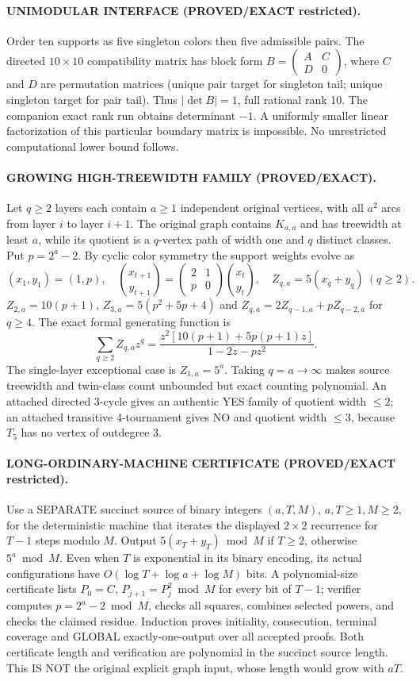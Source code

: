 \documentclass[11pt]{article}
\begin{document}
\paragraph{UNIMODULAR INTERFACE (PROVED/EXACT restricted).}
Order ten supports as five singleton colors then five admissible pairs. The directed $10\times10$ compatibility matrix has block form $B=\left(\begin{smallmatrix}A&C\\D&0\end{smallmatrix}\right)$, where $C$ and $D$ are permutation matrices (unique pair target for singleton tail; unique singleton target for pair tail). Thus $|\det B|=1$, full rational rank 10. The companion exact rank run obtains determinant $-1$. A uniformly smaller linear factorization of this particular boundary matrix is impossible. No unrestricted computational lower bound follows.
\paragraph{GROWING HIGH-TREEWIDTH FAMILY (PROVED/EXACT).}
Let $q\ge2$ layers each contain $a\ge1$ independent original vertices, with all $a^2$ arcs from layer $i$ to layer $i+1$. The original graph contains $K_{a,a}$ and has treewidth at least $a$, while its quotient is a $q$-vertex path of width one and $q$ distinct classes. Put $p=2^a-2$. By cyclic color symmetry the support weights evolve as
\[
(x_1,y_1)=(1,p),\quad
\binom{x_{t+1}}{y_{t+1}}=
\begin{pmatrix}2&1\\p&0\end{pmatrix}
\binom{x_t}{y_t},
\quad Z_{q,a}=5(x_q+y_q)\ (q\ge2).
\]
$Z_{2,a}=10(p+1)$, $Z_{3,a}=5(p^2+5p+4)$ and $Z_{q,a}=2Z_{q-1,a}+pZ_{q-2,a}$ for $q\ge4$. The exact formal generating function is
\[
\sum_{q\ge2}Z_{q,a}z^q =
\frac{z^2[10(p+1)+5p(p+1)z]}{1-2z-pz^2}.
\]
The single-layer exceptional case is $Z_{1,a}=5^a$. Taking $q=a\to\infty$ makes source treewidth and twin-class count unbounded but exact counting polynomial. An attached directed 3-cycle gives an authentic YES family of quotient width $\le2$; an attached transitive 4-tournament gives NO and quotient width $\le3$, because $T_5$ has no vertex of outdegree 3.
\paragraph{LONG-ORDINARY-MACHINE CERTIFICATE (PROVED/EXACT restricted).}
Use a SEPARATE succinct source of binary integers $(a,T,M)$, $a,T\ge1,M\ge2$, for the deterministic machine that iterates the displayed $2\times2$ recurrence for $T-1$ steps modulo $M$. Output $5(x_T+y_T)\bmod M$ if $T\ge2$, otherwise $5^a\bmod M$. Even when $T$ is exponential in its binary encoding, its actual configurations have $O(\log T+\log a+\log M)$ bits. A polynomial-size certificate lists $P_0=C$, $P_{j+1}=P_j^2\bmod M$ for every bit of $T-1$; verifier computes $p=2^a-2\bmod M$, checks all squares, combines selected powers, and checks the claimed residue. Induction proves initiality, consecution, terminal coverage and GLOBAL exactly-one-output over all accepted proofs. Both certificate length and verification are polynomial in the succinct source length. This IS NOT the original explicit graph input, whose length would grow with $aT$.
\end{document}
